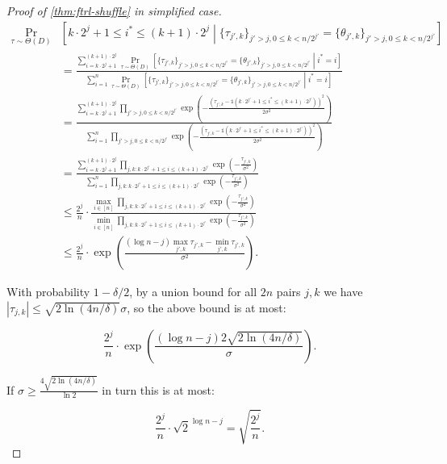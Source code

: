 \begin{proof}[Proof of \cref{thm:ftrl-shuffle} in simplified case]
\begin{align*}
\Pr_{\tau \sim \Theta(D)}&\left[k \cdot 2^j + 1 \leq i^* \leq (k+1) \cdot 2^j \middle|\{\tau_{j',k}\}_{j' > j, 0 \leq k < n/2^{j'}} = \{\theta_{j',k}\}_{j' > j, 0 \leq k < n/2^{j'}}\right] \\
&= \frac{\sum_{i = k \cdot 2^j + 1}^{(k+1) \cdot 2^j} \Pr_{\tau \sim \Theta(D)}\left[\{\tau_{j',k}\}_{j' > j, 0 \leq k < n/2^{j'}} = \{\theta_{j',k}\}_{j' > j, 0 \leq k < n/2^{j'}}\middle | i^* = i \right]}{\sum_{i = 1}^{n} \Pr_{\tau \sim \Theta(D)}\left[\{\tau_{j',k}\}_{j' > j, 0 \leq k < n/2^{j'}} = \{\theta_{j',k}\}_{j' > j, 0 \leq k < n/2^{j'}}\middle | i^* = i \right]}\\
&= \frac{\sum_{i = k \cdot 2^j + 1}^{(k+1) \cdot 2^j} \prod_{j' > j, 0 \leq k < n/2^{j'}} \exp\left(-\frac{\left(\tau_{j',k} - \mathbb{1}(k \cdot 2^{j'}+ 1 \leq i^* \leq (k+1) \cdot 2^{j'}) \right)^2}{2\sigma^2}\right) }{\sum_{i = 1}^{n} \prod_{j' > j, 0 \leq k < n/2^{j'}} \exp\left(-\frac{\left(\tau_{j',k} - \mathbb{1}(k \cdot 2^{j'}+ 1 \leq i^* \leq (k+1) \cdot 2^{j'}) \right)^2}{2\sigma^2}\right)}\\
&= \frac{\sum_{i = k \cdot 2^j + 1}^{(k+1) \cdot 2^j} \prod_{j,k:k \cdot 2^{j'} + 1 \leq i \leq (k+1) \cdot 2^{j'}} \exp\left(-\frac{\tau_{j',k}}{\sigma^2}\right)}{\sum_{i = 1}^{n} \prod_{j,k:k \cdot 2^{j'} + 1 \leq i \leq (k+1) \cdot 2^{j'}} \exp\left(-\frac{ \tau_{j',k}}{\sigma^2}\right)}\\
&\leq \frac{2^j}{n} \cdot \frac{\max_{i \in [n]} \prod_{j,k:k \cdot 2^{j'} + 1 \leq i \leq (k+1) \cdot 2^{j'}} \exp\left(-\frac{\tau_{j',k}}{\sigma^2}\right)}{\min_{i \in [n]}\prod_{j,k:k \cdot 2^{j'} + 1 \leq i \leq (k+1) \cdot 2^{j'}} \exp\left(-\frac{\tau_{j',k} }{\sigma^2}\right)} \\
&\leq \frac{2^j}{n} \cdot \exp\left(\frac{(\log n - j) \max_{j',k} \tau_{j',k} - \min_{j',k} \tau_{j',k}}{\sigma^2}\right).
\end{align*}

With probability $1 - \delta/2$, by a union bound for all $2n$ pairs $j, k$ we have $|\tau_{j,k}| \leq \sqrt{2 \ln(4n/\delta)} \sigma$, so the above bound is at most:

\[\frac{2^j}{n} \cdot \exp\left(\frac{(\log n - j) 2 \sqrt{2 \ln (4n/\delta)}}{\sigma}\right).\]

If $\sigma \geq \frac{4 \sqrt{2 \ln (4n/\delta)}}{\ln 2}$ in turn this is at most:

\[\frac{2^j}{n} \cdot \sqrt{2}^{\log n - j} = \sqrt{\frac{2^j}{n}}.\]


\end{proof}

